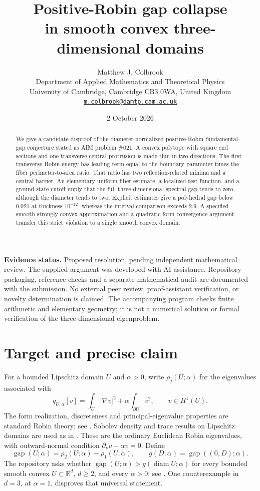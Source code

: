 \documentclass[11pt,a4paper]{article}
\title{Positive-Robin gap collapse\\in smooth convex three-dimensional domains}
\author{Matthew J. Colbrook\\[3pt]
\small Department of Applied Mathematics and Theoretical Physics\\
\small University of Cambridge, Cambridge CB3 0WA, United Kingdom\\
\small\href{mailto:m.colbrook@damtp.cam.ac.uk}{\texttt{m.colbrook@damtp.cam.ac.uk}}}
\date{2 October 2026}
\theoremstyle{remark}
\newcommand{\R}{\mathbb R}
\newcommand{\gap}{\operatorname{gap}}
\newcommand{\diam}{\operatorname{diam}}
\begin{document}
\maketitle
\thispagestyle{empty}

\begin{abstract}
We give a candidate disproof of the diameter-normalized positive-Robin fundamental-gap conjecture stated as AIM problem \#021. A convex polytope with square end sections and one transverse central protrusion is made thin in two directions. The first transverse Robin energy has leading term equal to the boundary parameter times the fiber perimeter-to-area ratio. That ratio has two reflection-related minima and a central barrier. An elementary uniform fiber estimate, a localized test function, and a ground-state cutoff imply that the full three-dimensional spectral gap tends to zero, although the diameter tends to two. Explicit estimates give a polyhedral gap below $0.021$ at thickness $10^{-12}$, whereas the interval comparison exceeds $2.9$. A specified smooth strongly convex approximation and a quadratic-form convergence argument transfer this strict violation to a single smooth convex domain.
\end{abstract}

\medskip
\textbf{Evidence status.} Proposed resolution, pending independent mathematical review. The supplied argument was developed with AI assistance. Repository packaging, reference checks and a separate mathematical audit are documented with the submission. No external peer review, proof-assistant verification, or novelty determination is claimed. The accompanying program checks finite arithmetic and elementary geometry; it is not a numerical solution or formal verification of the three-dimensional eigenproblem.

\section{Target and precise claim}
For a bounded Lipschitz domain $U$ and $\alpha>0$, write $\rho_j(U;\alpha)$ for the eigenvalues associated with
\[
 q_{U,\alpha}[v]=\int_U |\nabla v|^2+\alpha\int_{\partial U}v^2,
 \qquad v\in H^1(U).
\]
The form realization, discreteness and principal-eigenvalue properties are standard Robin theory; see \cite{daners}. Sobolev density and trace results on Lipschitz domains are used as in \cite[Chapter 3]{mclean}. These are the ordinary Euclidean Robin eigenvalues, with outward-normal condition $\partial_\nu v+\alpha v=0$. Define
\[
 \gap(U;\alpha)=\rho_2(U;\alpha)-\rho_1(U;\alpha),\qquad
 g(D;\alpha)=\gap((0,D);\alpha).
\]
The repository asks whether $\gap(U;\alpha)>g(\diam U;\alpha)$ for every bounded smooth convex $U\subset\R^d$, $d\ge2$, and every $\alpha>0$; see \cite{aim,laugesen,andrews2020}. One counterexample in $d=3$, at $\alpha=1$, disproves that universal statement.
\end{document}
